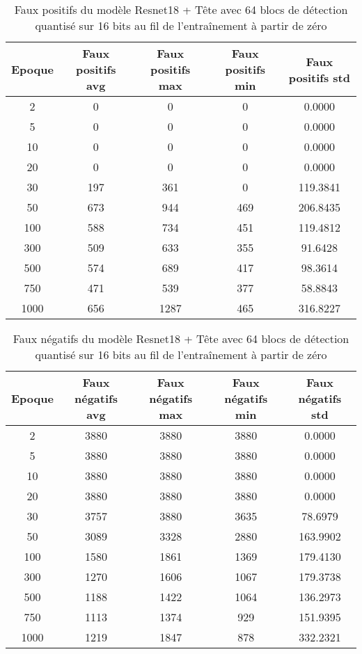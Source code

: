\begin{table}[!ht]
    \caption{Faux positifs du modèle Resnet18 + Tête avec 64 blocs de détection quantisé sur 16 bits au fil de l'entraînement à partir de zéro}
    \label{tab:qresnet18+head_64n_false_positive_16b_from_scratch}
    \centering
    \begin{tabular}{ |c||c|c|c|c|  }
        \hline
        \rowcolor{gray!50}
        Epoque & Faux positifs avg & Faux positifs max & Faux positifs min & Faux positifs std\\
        \hline
        2 & 0 & 0 & 0 & 0.0000\\
        5 & 0 & 0 & 0 & 0.0000\\
        10 & 0 & 0 & 0 & 0.0000\\
        20 & 0 & 0 & 0 & 0.0000\\
        30 & 197 & 361 & 0 & 119.3841\\
        50 & 673 & 944 & 469 & 206.8435\\
        100 & 588 & 734 & 451 & 119.4812\\
        300 & 509 & 633 & 355 & 91.6428\\
        500 & 574 & 689 & 417 & 98.3614\\
        750 & 471 & 539 & 377 & 58.8843\\
        1000 & 656 & 1287 & 465 & 316.8227\\
        \hline
    \end{tabular}
\end{table}

\begin{table}[!ht]
    \caption{Faux négatifs du modèle Resnet18 + Tête avec 64 blocs de détection quantisé sur 16 bits au fil de l'entraînement à partir de zéro}
    \label{tab:qresnet18+head_64n_false_negative_16b_from_scratch}
    \centering
    \begin{tabular}{ |c||c|c|c|c|  }
        \hline
        \rowcolor{gray!50}
        Epoque & Faux négatifs avg & Faux négatifs max & Faux négatifs min & Faux négatifs std\\
        \hline
        2 & 3880 & 3880 & 3880 & 0.0000\\
        5 & 3880 & 3880 & 3880 & 0.0000\\
        10 & 3880 & 3880 & 3880 & 0.0000\\
        20 & 3880 & 3880 & 3880 & 0.0000\\
        30 & 3757 & 3880 & 3635 & 78.6979\\
        50 & 3089 & 3328 & 2880 & 163.9902\\
        100 & 1580 & 1861 & 1369 & 179.4130\\
        300 & 1270 & 1606 & 1067 & 179.3738\\
        500 & 1188 & 1422 & 1064 & 136.2973\\
        750 & 1113 & 1374 & 929 & 151.9395\\
        1000 & 1219 & 1847 & 878 & 332.2321\\
        \hline
    \end{tabular}
\end{table}

